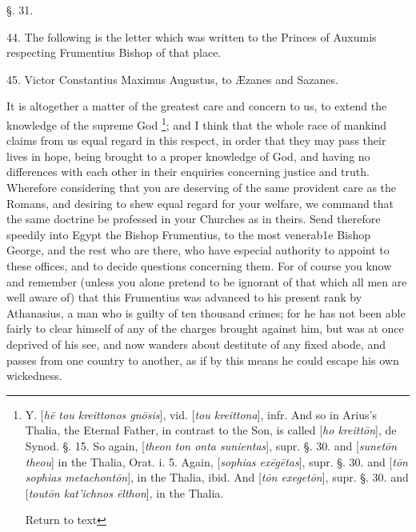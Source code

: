 §. 31.

44. The following is the letter which was written to the Princes of
Auxumis respecting Frumentius Bishop of that place.

45. Victor Constantius Maximus Augustus, to Æzanes and Sazanes.

It is altogether a matter of the greatest care and concern to us, to
extend the knowledge of the supreme God \footnote{Y. [\emph{h\={e}
tou kreittonos gn\={o}sis}],
vid. [\emph{tou
kreittona}], infr. And so in Arius's Thalia, the Eternal Father, in contrast to
the Son, is called [\emph{ho
kreitt\={o}n}],
de Synod. §. 15. So again, [\emph{theon
ton onta sunientas}],
supr. §. 30. and [\emph{sunet\={o}n theou}] in the Thalia, Orat. i. 5. Again, [\emph{sophias
ex\={e}g\={e}tas}], supr. §. 30. and [\emph{t\={o}n sophias metachont\={o}n}],
in the Thalia, ibid. And [\emph{t\={o}n exeget\={o}n}], supr. §. 30. and [\emph{tout\={o}n
kat}\emph{'}\emph{ichnos \={e}lthon}], in the Thalia.

Return to text}; and I think that the whole race of mankind claims from us
equal regard in this respect, in order that they may pass their lives
in hope, being brought to a proper knowledge of God, and having no
differences with each other in their enquiries concerning justice and
truth. Wherefore considering that you are deserving of the same
provident care as the Romans, and desiring to shew equal regard for
your welfare, we command that the same doctrine be professed in your
Churches as in theirs. Send therefore speedily into Egypt the Bishop
Frumentius, to the most venerab1e Bishop George, and the rest who are
there, who have especial authority to appoint to these offices, and to
decide questions concerning them. For of course you know and remember
(unless you alone pretend to be ignorant of that which all men
are well aware of) that this Frumentius was advanced to his present
rank by Athanasius, a man who is guilty of ten thousand crimes; for he
has not been able fairly to clear himself of any of the charges
brought against him, but was at once deprived of his see, and now
wanders about destitute of any fixed abode, and passes from one
country to another, as if by this means he could escape his own
wickedness.

